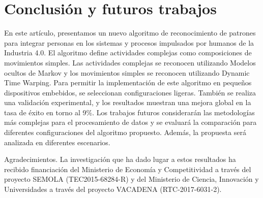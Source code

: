 \documentclass[10pt]{article}
\begin{document}
\section{Conclusión y futuros trabajos}
En este artículo, presentamos un nuevo algoritmo de reconocimiento de patrones para integrar personas en los sistemas y procesos impulsados por humanos de la Industria 4.0. El algoritmo define actividades complejas como composiciones de movimientos simples. Las actividades complejas se reconocen utilizando Modelos ocultos de Markov y los movimientos simples se reconocen utilizando Dynamic Time Warping. 
Para permitir la implementación de este algoritmo en pequeños dispositivos embebidos, se seleccionan configuraciones ligeras. También se realiza una validación experimental, y los resultados muestran una mejora global en la tasa de éxito en torno al 9\%. Los trabajos futuros considerarán las metodologías más complejas para el procesamiento de datos y se evaluará la comparación para diferentes configuraciones del algoritmo propuesto. Además, la propuesta será analizada en diferentes escenarios. 


Agradecimientos. La investigación que ha dado lugar a estos resultados ha recibido financiación del Ministerio de Economía y Competitividad a través del proyecto SEMOLA (TEC2015-68284-R) y del Ministerio de Ciencia, Innovación y Universidades a través del proyecto VACADENA (RTC-2017-6031-2).
\end{document}
